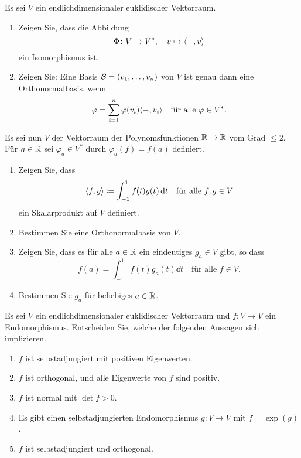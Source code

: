 \documentclass[a4paper,10pt]{scrartcl}
\begin{document}
\begin{question}
  Es sei $V$ ein endlichdimensionaler euklidischer Vektorraum.
  \begin{enumerate}[leftmargin=*]
    \item
      Zeigen Sie, dass die Abbildung
      \[
        \Phi \colon V \to V^*,
        \quad
        v \mapsto \langle -,v \rangle
      \]
      ein Isomorphismus ist.
    \item
      Zeigen Sie:
      Eine Basis $\mathcal{B} = (v_1, \dotsc, v_n)$ von $V$ ist genau dann eine Orthonormalbasis, wenn
      \[
          \varphi
        = \sum_{i=1}^n \varphi(v_i) \langle -,v_i \rangle
        \quad
        \text{für alle $\varphi \in V^*$}.
      \]
  \end{enumerate}
  Es sei nun $V$ der Vektorraum der Polynomsfunktionen $\mathbb{R} \to \mathbb{R}$ vom Grad $\leq 2$.
  Für $a \in \mathbb{R}$ sei $\varphi_a \in V^*$ durch $\varphi_a(f) = f(a)$ definiert.
  \begin{enumerate}[leftmargin=*, resume]
    \item
      Zeigen Sie, dass
      \[
        \langle f, g \rangle \coloneqq \int_{-1}^1 f(t)g(t) \,\text{d}t
        \quad
        \text{für alle $f, g \in V$}
      \]
      ein Skalarprodukt auf $V$ definiert.
    \item
      Bestimmen Sie eine Orthonormalbasis von $V$.
    \item
      Zeigen Sie, dass es für alle $a \in \mathbb{R}$ ein eindeutiges $g_a \in V$ gibt, so dass
      \[
          f(a)
        = \int_{-1}^1 f(t) g_a(t) \dd{t}
        \quad
        \text{für alle $f \in V$}.
      \]
    \item
      Bestimmen Sie $g_a$ für beliebiges $a \in \mathbb{R}$.
  \end{enumerate}
\end{question}


\begin{question}
  Es sei $V$ ein endlichdimensionaler euklidischer Vektorraum und $f \colon V \to V$ ein Endomorphismus.
  Entscheiden Sie, welche der folgenden Aussagen sich implizieren.
  \begin{enumerate}
    \item
      $f$ ist selbstadjungiert mit positiven Eigenwerten.
    \item
      $f$ ist orthogonal, und alle Eigenwerte von $f$ sind positiv.
    \item
      $f$ ist normal mit $\det f > 0$.
    \item
      Es gibt einen selbstadjungierten Endomorphismus $g \colon V \to V$ mit $f = \exp(g)$.
    \item
      $f$ ist selbstadjungiert und orthogonal.
  \end{enumerate}
\end{question}
\end{document}
